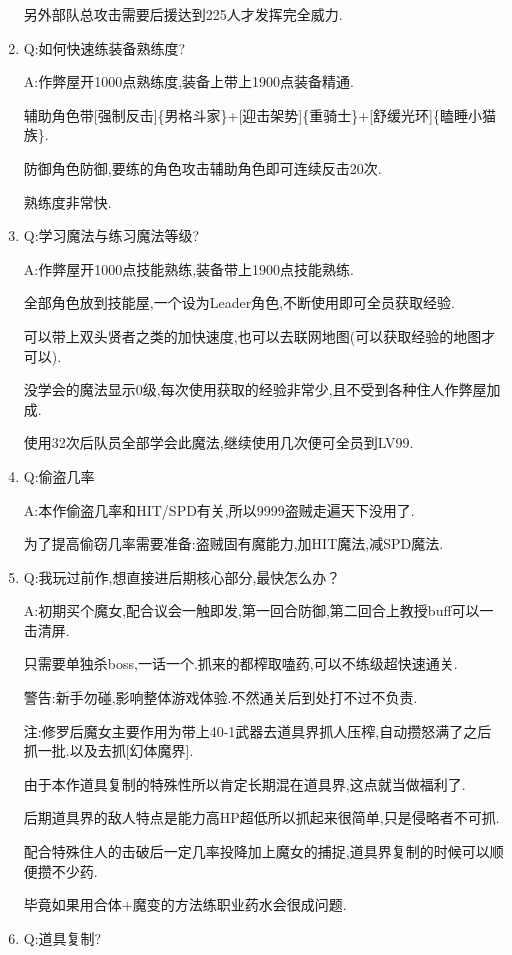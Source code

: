 \begin{enumerate}
	另外部队总攻击需要后援达到225人才发挥完全威力.

	\item
	Q:如何快速练装备熟练度?

	A:作弊屋开1000点熟练度,装备上带上1900点装备精通.

	辅助角色带[强制反击]\{男格斗家\}+[迎击架势]\{重骑士\}+[舒缓光环]\{瞌睡小猫族\}.

	防御角色防御,要练的角色攻击辅助角色即可连续反击20次.

	熟练度非常快.

	\item
	Q:学习魔法与练习魔法等级?
	
	A:作弊屋开1000点技能熟练,装备带上1900点技能熟练.

	全部角色放到技能屋,一个设为Leader角色,不断使用即可全员获取经验.

	可以带上双头贤者之类的加快速度,也可以去联网地图(可以获取经验的地图才可以).

	没学会的魔法显示0级,每次使用获取的经验非常少,且不受到各种住人作弊屋加成.

	使用32次后队员全部学会此魔法,继续使用几次便可全员到LV99.

	\item
	Q:偷盗几率

	A:本作偷盗几率和HIT/SPD有关,所以9999盗贼走遍天下没用了.

	为了提高偷窃几率需要准备:盗贼固有魔能力,加HIT魔法,减SPD魔法.

	\item
	Q:我玩过前作,想直接进后期核心部分,最快怎么办？

	A:初期买个魔女,配合议会一触即发,第一回合防御,第二回合上教授buff可以一击清屏.

	只需要单独杀boss,一话一个.抓来的都榨取嗑药,可以不练级超快速通关.

	警告:新手勿碰,影响整体游戏体验.不然通关后到处打不过不负责.

	注:修罗后魔女主要作用为带上40-1武器去道具界抓人压榨,自动攒怒满了之后抓一批.以及去抓[幻体魔界].

	由于本作道具复制的特殊性所以肯定长期混在道具界,这点就当做福利了.

	后期道具界的敌人特点是能力高HP超低所以抓起来很简单,只是侵略者不可抓.

	配合特殊住人的击破后一定几率投降加上魔女的捕捉,道具界复制的时候可以顺便攒不少药.

	毕竟如果用合体+魔变的方法练职业药水会很成问题.


	\item
	Q:道具复制?


\end{enumerate}
